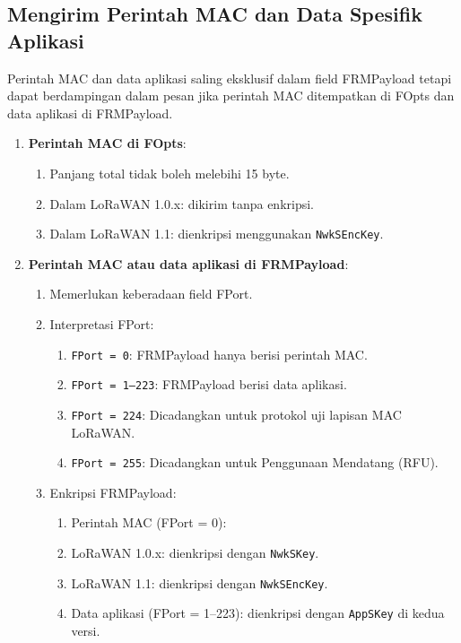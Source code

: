 \subsection{Mengirim Perintah MAC dan Data Spesifik Aplikasi}
Perintah MAC dan data aplikasi saling eksklusif dalam field FRMPayload tetapi dapat berdampingan dalam pesan jika perintah MAC ditempatkan di FOpts dan data aplikasi di FRMPayload.
\begin{enumerate}
    \item \textbf{Perintah MAC di FOpts}:
          \begin{enumerate}
              \item Panjang total tidak boleh melebihi 15 byte.
              \item Dalam LoRaWAN 1.0.x: dikirim tanpa enkripsi.
              \item Dalam LoRaWAN 1.1: dienkripsi menggunakan \texttt{NwkSEncKey}.
          \end{enumerate}
    \item \textbf{Perintah MAC atau data aplikasi di FRMPayload}:
          \begin{enumerate}
              \item Memerlukan keberadaan field FPort.
              \item Interpretasi FPort:
                    \begin{enumerate}
                        \item \texttt{FPort = 0}: FRMPayload hanya berisi perintah MAC.
                        \item \texttt{FPort = 1–223}: FRMPayload berisi data aplikasi.
                        \item \texttt{FPort = 224}: Dicadangkan untuk protokol uji lapisan MAC LoRaWAN.
                        \item \texttt{FPort = 255}: Dicadangkan untuk Penggunaan Mendatang (RFU).
                    \end{enumerate}
              \item Enkripsi FRMPayload:
                    \begin{enumerate}
                        \item Perintah MAC (FPort = 0):
                        \item LoRaWAN 1.0.x: dienkripsi dengan \texttt{NwkSKey}.
                        \item LoRaWAN 1.1: dienkripsi dengan \texttt{NwkSEncKey}.
                        \item Data aplikasi (FPort = 1–223): dienkripsi dengan \texttt{AppSKey} di kedua versi.
                    \end{enumerate}
          \end{enumerate}
\end{enumerate}
